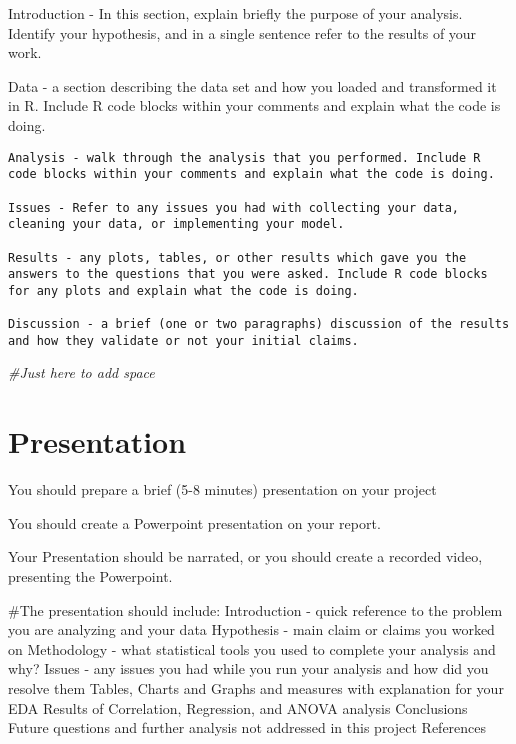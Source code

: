 \documentclass[
]{article}
\newenvironment{Shaded}{\begin{snugshade}}{\end{snugshade}}
\newcommand{\CommentTok}[1]{\textcolor[rgb]{0.56,0.35,0.01}{\textit{#1}}}
\begin{document}
Introduction - In this section, explain briefly the purpose of your
analysis. Identify your hypothesis, and in a single sentence refer to
the results of your work.

Data - a section describing the data set and how you loaded and
transformed it in R. Include R code blocks within your comments and
explain what the code is doing.

\begin{verbatim}
Analysis - walk through the analysis that you performed. Include R code blocks within your comments and explain what the code is doing.

Issues - Refer to any issues you had with collecting your data, cleaning your data, or implementing your model.

Results - any plots, tables, or other results which gave you the answers to the questions that you were asked. Include R code blocks for any plots and explain what the code is doing.

Discussion - a brief (one or two paragraphs) discussion of the results and how they validate or not your initial claims. 
\end{verbatim}

\begin{Shaded}
\begin{Highlighting}[]
\CommentTok{#Just here to add space}
\end{Highlighting}
\end{Shaded}

\hypertarget{presentation}{%
\section{Presentation}\label{presentation}}

You should prepare a brief (5-8 minutes) presentation on your project

You should create a Powerpoint presentation on your report.

Your Presentation should be narrated, or you should create a recorded
video, presenting the Powerpoint.

\#The presentation should include: Introduction - quick reference to the
problem you are analyzing and your data Hypothesis - main claim or
claims you worked on Methodology - what statistical tools you used to
complete your analysis and why? Issues - any issues you had while you
run your analysis and how did you resolve them Tables, Charts and Graphs
and measures with explanation for your EDA Results of Correlation,
Regression, and ANOVA analysis Conclusions Future questions and further
analysis not addressed in this project References
\end{document}
